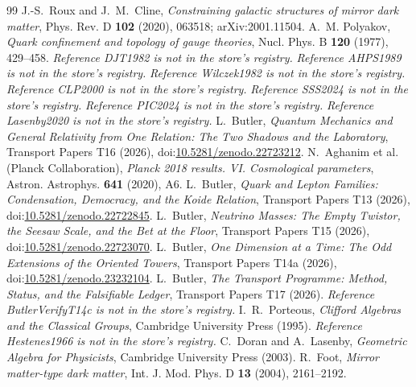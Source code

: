 \documentclass[11pt]{article}
\theoremstyle{definition}
\theoremstyle{plain}
\begin{document}
\begin{thebibliography}{99}
 J.-S.~Roux and J.~M.~Cline,
\emph{Constraining galactic structures of mirror dark matter},
Phys. Rev. D \textbf{102} (2020), 063518; arXiv:2001.11504.
 A.~M. Polyakov,
\emph{Quark confinement and topology of gauge theories},
Nucl. Phys. B \textbf{120} (1977), 429--458.
 \emph{Reference DJT1982 is not in the store's registry.}
 \emph{Reference AHPS1989 is not in the store's registry.}
 \emph{Reference Wilczek1982 is not in the store's registry.}
 \emph{Reference CLP2000 is not in the store's registry.}
 \emph{Reference SSS2024 is not in the store's registry.}
 \emph{Reference PIC2024 is not in the store's registry.}
 \emph{Reference Lasenby2020 is not in the store's registry.}
 L.~Butler,
\emph{Quantum Mechanics and General Relativity from One Relation: The Two Shadows and the Laboratory},
Transport Papers T16 (2026), doi:\href{https://doi.org/10.5281/zenodo.22723212}{10.5281/zenodo.22723212}.
 N.~Aghanim et al. (Planck Collaboration),
\emph{Planck 2018 results. VI. Cosmological parameters},
Astron. Astrophys. \textbf{641} (2020), A6.
 L.~Butler,
\emph{Quark and Lepton Families: Condensation, Democracy, and the Koide Relation},
Transport Papers T13 (2026), doi:\href{https://doi.org/10.5281/zenodo.22722845}{10.5281/zenodo.22722845}.
 L.~Butler,
\emph{Neutrino Masses: The Empty Twistor, the Seesaw Scale, and the Bet at the Floor},
Transport Papers T15 (2026), doi:\href{https://doi.org/10.5281/zenodo.22723070}{10.5281/zenodo.22723070}.
 L.~Butler,
\emph{One Dimension at a Time: The Odd Extensions of the Oriented Towers},
Transport Papers T14a (2026), doi:\href{https://doi.org/10.5281/zenodo.23232104}{10.5281/zenodo.23232104}.
 L.~Butler,
\emph{The Transport Programme: Method, Status, and the Falsifiable Ledger},
Transport Papers T17 (2026).
 \emph{Reference ButlerVerifyT14c is not in the store's registry.}
 I.~R.~Porteous,
\emph{Clifford Algebras and the Classical Groups},
Cambridge University Press (1995).
 \emph{Reference Hestenes1966 is not in the store's registry.}
 C.~Doran and A.~Lasenby,
\emph{Geometric Algebra for Physicists},
Cambridge University Press (2003).
 R.~Foot,
\emph{Mirror matter-type dark matter},
Int. J. Mod. Phys. D \textbf{13} (2004), 2161--2192.
\end{thebibliography}
\end{document}

